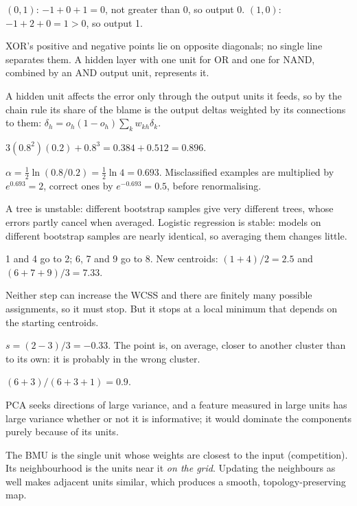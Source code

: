 \begin{ans}
  \item $(0, 1)$: $-1 + 0 + 1 = 0$, not greater than 0, so output 0. $(1, 0)$:
        $-1 + 2 + 0 = 1 > 0$, so output 1.
  \item XOR's positive and negative points lie on opposite diagonals; no single line
        separates them. A hidden layer with one unit for OR and one for NAND, combined
        by an AND output unit, represents it.
  \item A hidden unit affects the error only through the output units it feeds, so
        by the chain rule its share of the blame is the output deltas weighted by its
        connections to them: $\delta_h = o_h(1 - o_h)\sum_k w_{kh}\delta_k$.
\end{ans}

\begin{ans}
  \item $3(0.8^2)(0.2) + 0.8^3 = 0.384 + 0.512 = 0.896$.
  \item $\alpha = \tfrac{1}{2}\ln(0.8/0.2) = \tfrac{1}{2}\ln 4 = 0.693$. Misclassified
        examples are multiplied by $e^{0.693} = 2$, correct ones by $e^{-0.693} = 0.5$,
        before renormalising.
  \item A tree is unstable: different bootstrap samples give very different trees, whose
        errors partly cancel when averaged. Logistic regression is stable: models on
        different bootstrap samples are nearly identical, so averaging them changes
        little.
\end{ans}

\begin{ans}
  \item 1 and 4 go to 2; 6, 7 and 9 go to 8. New centroids: $(1 + 4)/2 = 2.5$ and
        $(6 + 7 + 9)/3 = 7.33$.
  \item Neither step can increase the WCSS and there are finitely many possible
        assignments, so it must stop. But it stops at a local minimum that depends on
        the starting centroids.
  \item $s = (2 - 3)/3 = -0.33$. The point is, on average, closer to another cluster
        than to its own: it is probably in the wrong cluster.
\end{ans}

\begin{ans}
  \item $(6 + 3)/(6 + 3 + 1) = 0.9$.
  \item PCA seeks directions of large variance, and a feature measured in large units
        has large variance whether or not it is informative; it would dominate the
        components purely because of its units.
  \item The BMU is the single unit whose weights are closest to the input
        (competition). Its neighbourhood is the units near it \emph{on the grid}.
        Updating the neighbours as well makes adjacent units similar, which produces a
        smooth, topology-preserving map.
\end{ans}

